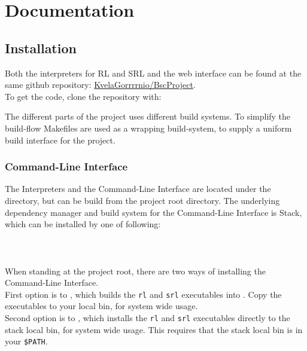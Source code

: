 \chapter*{Documentation}
%

\section*{Installation}
%

Both the interpreters for RL and SRL and the web interface can be found at the same github repository: \href{https://github.com/KvelaGorrrrnio/BscProject}{KvelaGorrrrnio/BscProject}.\\
To get the code, clone the repository with:

The different parts of the project uses different build systems. To simplify the build-flow Makefiles are used as a wrapping build-system, to supply a uniform build interface for the project.

\subsection*{Command-Line Interface}
%
The Interpreters and the Command-Line Interface are located under the  directory, but can be build from the project root directory.
The underlying dependency manager and build system for the Command-Line Interface is Stack, which can be installed by one of following:\\
\\
\\
\\

\noindent
When standing at the project root, there are two ways of installing the Command-Line Interface.\\
First option is to , which builds the \texttt{rl} and \texttt{srl} executables into . Copy the executables to your local bin, for system wide usage.\\
Second option is to , which installs the \texttt{rl} and \texttt{srl} executables directly to the stack local bin, for system wide usage. This requires that the stack local bin is in your \texttt{\$PATH}.

